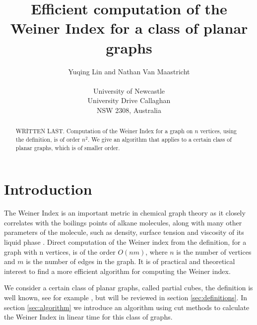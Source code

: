 \documentclass[11pt,a4paper]{article}
\begin{document}
%
%

\title{Efficient computation of the Weiner Index for a class of planar graphs}
\author{Yuqing Lin and Nathan Van Maastricht\\
\, \\
University of Newcastle\\
University Drive Callaghan\\
NSW 2308, Australia\\
}
\date{}

\maketitle

\begin{abstract}
	WRITTEN LAST.  Computation of the Weiner Index for a graph on $n$ vertices,  using the definition, is of order $n^2$.   We give an algorithm that applies to a certain class of planar graphs, which is of smaller order.
\end{abstract}


\section{Introduction} 


The Weiner Index is an important metric in chemical graph theory as it closely correlates with the boilings points of alkane molecules, along with many other parameters of the molecule, such as density, surface tension and viscosity of its liquid phase \cite{R1976}. Direct computation of the Weiner index from the definition, for a graph with n vertices, is of the order $O(nm)$, where $n$ is the number of vertices and $m$ is the number of edges in the graph.  It is of practical and theoretical interest to find a more efficient algorithm for computing the Weiner index.

We consider a certain class of planar graphs, called partial cubes, the definition is well known, see for example \cite{K2015}, but will be reviewed in section \ref{sec:definitions}. In section \ref{sec:algorithm} we introduce an algorithm using cut methods to calculate the Weiner Index in linear time for this class of graphs.
\end{document}

